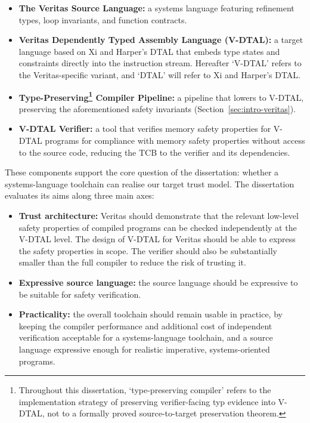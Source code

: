 \begin{itemize}
  \item \textbf{The Veritas Source Language:} a systems language featuring refinement types, loop invariants, and function contracts.
  \item \textbf{Veritas Dependently Typed Assembly Language (V-DTAL):} a target language based on Xi and Harper's DTAL \cite{Xi2001DTAL} that embeds type states and constraints directly into the instruction stream. Hereafter `V-DTAL' refers to the Veritas-specific variant, and `DTAL' will refer to Xi and Harper's DTAL.
  \item \textbf{Type-Preserving\footnote{Throughout this dissertation, `type-preserving compiler' refers to the implementation strategy of preserving verifier-facing typ evidence into V-DTAL, not to a formally proved source-to-target preservation theorem.} Compiler Pipeline:} a pipeline that lowers to V-DTAL, preserving the aforementioned safety invariants (Section~\ref{sec:intro-veritas}).
  \item \textbf{V-DTAL Verifier:} a tool that verifies memory safety properties for V-DTAL programs for compliance with memory safety properties without access to the source code, reducing the TCB to the verifier and its dependencies.
\end{itemize}
These components support the core question of the dissertation: whether a systems-language toolchain can realise our target trust model. The dissertation evaluates its aims along three main axes:
\begin{itemize}
  \item \textbf{Trust architecture:} Veritas should demonstrate that the relevant low-level safety properties of compiled programs can be checked independently at the V-DTAL level. The design of V-DTAL for Veritas should be able to express the safety properties in scope. The verifier should also be substantially smaller than the full compiler to reduce the risk of trusting it.
  \item \textbf{Expressive source language:} the source language should be expressive to be suitable for safety verification.
  \item \textbf{Practicality:} the overall toolchain should remain usable in practice, by keeping the compiler performance and additional cost of independent verification acceptable for a systems-language toolchain, and a source language expressive enough for realistic imperative, systems-oriented programs.
\end{itemize}

